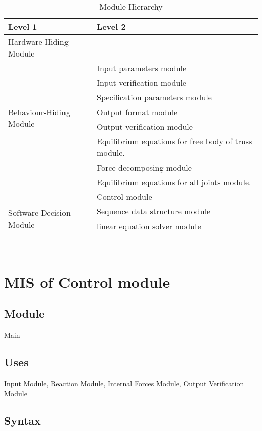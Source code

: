 \documentclass[12pt, titlepage]{article}
\begin{document}
\begin{table}[h!]
\centering
\begin{tabular}{p{} p{}}
\toprule
\textbf{Level 1} & \textbf{Level 2}\\
\midrule

{Hardware-Hiding Module} & ~ \\
\midrule

\multirow{7}{0.3\textwidth}{Behaviour-Hiding Module} & Input parameters module\\
& Input verification module\\
& Specification parameters module\\
& Output format module\\
& Output verification module\\
& Equilibrium equations for free body of truss module. \\
& Force decomposing module\\
& Equilibrium equations for all joints module.\\
& Control module\\ 

\midrule

\multirow{3}{0.3\textwidth}{Software Decision Module} & Sequence data structure module\\
& linear equation solver module\\
\bottomrule

\end{tabular}
\caption{Module Hierarchy}
\label{TblMH}
\end{table}
\newpage
~\newpage

\section{MIS of Control module \label{mControl} }

\subsection{Module}

Main

\subsection{Uses}
Input Module, Reaction Module, Internal Forces Module, Output Verification Module

\subsection{Syntax}
\end{document}
